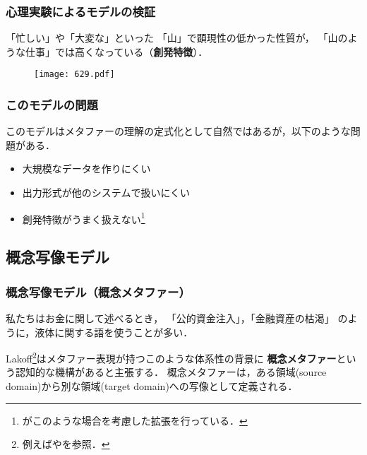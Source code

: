 \documentclass[11pt]{beamer}
\newlength{\la}
\let\oldcite=\citet
\renewcommand\citet[1]{\hyperlink{#1}{\oldcite{#1}}}
\begin{document}
\begin{frame}
    \frametitle{心理実験によるモデルの検証}
    「忙しい」や「大変な」といった
    「山」で顕現性の低かった性質が，
    「山のような仕事」では高くなっている（\textbf{創発特徴}）．
    \begin{figure}[h]
        \centering
        \texttt{[image: 629.pdf]}
    \end{figure}
\end{frame}

\begin{frame}
\frametitle{このモデルの問題}
このモデルはメタファーの理解の定式化として自然ではあるが，以下のような問題がある．
\begin{itemize}
    \item 大規模なデータを作りにくい
    \item 出力形式が他のシステムで扱いにくい
    \item 創発特徴がうまく扱えない\footnote[frame]{%
            \citet{utsumi1998}がこのような場合を考慮した拡張を行っている．
        }
\end{itemize}
\end{frame}

\subsection{概念写像モデル}
\begin{frame}
    \frametitle{概念写像モデル（概念メタファー）}
    私たちはお金に関して述べるとき，
    「公的資金注入」，「金融資産の枯渇」
    のように，液体に関する語を使うことが多い．

\bigskip

Lakoff\footnote[frame]{例えば\citet{lakoff1980}や\citet{lakoff1990women}を参照．}はメタファー表現が持つこのような体系性の背景に
\textbf{概念メタファー}という認知的な機構があると主張する．
概念メタファーは，ある領域(source domain)から別な領域(target domain)への写像として定義される．
\begin{center}
\end{center}
\end{frame}
\end{document}
